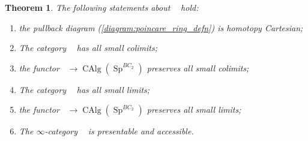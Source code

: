 \documentclass{article}
\DeclareMathOperator{\CAlg}{CAlg} %
\DeclareMathOperator{\CAlgp}{CAlg^p} %
\DeclareMathOperator{\Spectra}{Sp} %
\newtheorem{theorem}[equation]{Theorem}
\theoremstyle{definition}
\begin{document}
\begin{theorem}\label{thm:poincare_rings_cat_formal_properties}
    The following statements about $\CAlgp$ hold:
    \begin{enumerate}[label=(\arabic*)]
        \item \label{thmitem:defining_diagram_homotopy_pullback} the pullback diagram (\ref{diagram:poincare_ring_defn}) is homotopy Cartesian; %
        \item \label{thmitem:poincare_ring_has_colimits} The category $\CAlgp$ has all small colimits;
        \item \label{thmitem:poincare_ring_to_ring_preserves_colims} the functor $ \CAlgp \to \CAlg(\Spectra^{BC_2})$ preserves all small colimits;
        \item \label{thmitem:poincare_ring_has_limits} The category $\CAlgp$ has all small limits;
        \item \label{thmitem:poincare_ring_to_ring_preserves_lims} the functor $ \CAlgp \to \CAlg(\Spectra^{BC_2})$ preserves all small limits;
        \item \label{thmitem:poincare_rings_presentable_accessible} The $ \infty $-category $ \CAlgp $ is presentable and accessible. 
    \end{enumerate}
\end{theorem}
\end{document}
